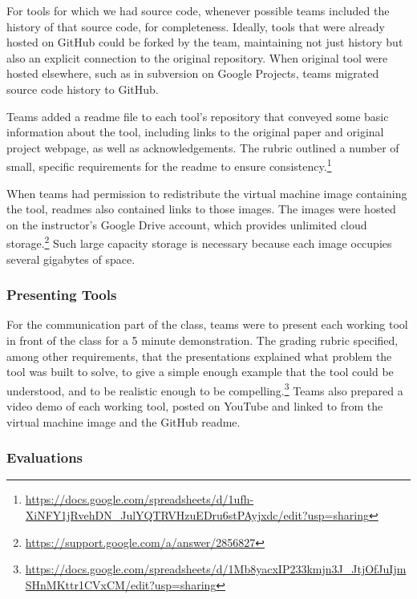 \documentclass{sig-alternate-05-2015}
\begin{document}

For tools for which we had source code,
whenever possible teams included the history
of that source code, for completeness.
Ideally, tools that were already hosted
on GitHub could be forked by the team,
maintaining not just history but also an 
explicit connection to the original repository.
When original tool were hosted elsewhere, such
as in subversion on Google Projects, 
teams migrated source code history to GitHub.

Teams added a readme file to each tool's repository
that conveyed some basic information about
the tool, including 
links to the original paper and
original project webpage, 
as well as acknowledgements.
The rubric outlined a number of small,
specific requirements for the readme to
ensure consistency.\footnote{\url{https://docs.google.com/spreadsheets/d/1ufh-XiNFY1jRvehDN_JulYQTRVHzuEDru6stPAyjxdc/edit?usp=sharing}}

When teams had permission to redistribute
the virtual machine image containing the tool,
readmes also contained links to those images.
The images were hosted on the instructor's 
Google Drive account, which provides unlimited
cloud storage.\footnote{\url{https://support.google.com/a/answer/2856827}}
Such large capacity storage is necessary because each
image occupies several gigabytes of space.

\subsubsection{Presenting Tools}

For the communication part of the class,
teams were to present each working tool in front of the class
for a 5 minute demonstration.
The grading rubric specified, among other requirements,
that the presentations explained what problem the 
tool was built to solve, to give a simple enough
example that the tool could be understood,
and to be realistic enough to be 
compelling.\footnote{\url{https://docs.google.com/spreadsheets/d/1Mb8yacxIP233kmjn3J_JtjOfJuIjmSHnMKttr1CVxCM/edit?usp=sharing}}
Teams also prepared a video demo of each working tool,
posted on YouTube and linked to from the virtual machine
image and the GitHub readme.

\subsubsection{Evaluations}
\end{document}
